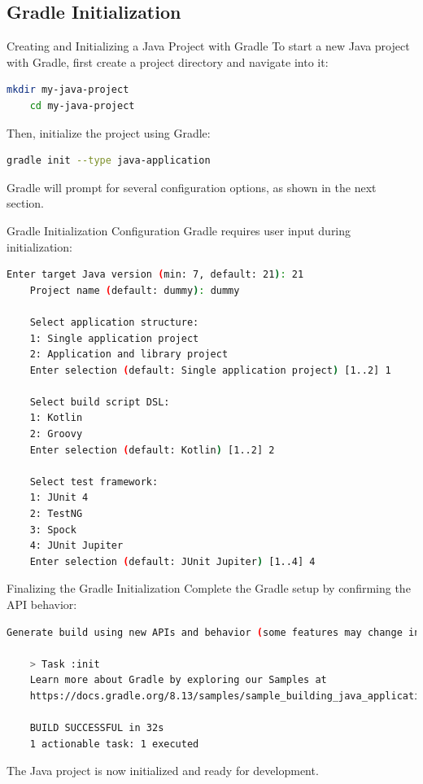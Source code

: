 \documentclass[aspectratio=169, table]{beamer}
\begin{document}
\subsection{Gradle Initialization}
\begin{frame}[fragile]{Creating and Initializing a Java Project with Gradle}
\vspace{20pt}
To start a new Java project with Gradle, first create a project directory and navigate into it:

\begin{lstlisting}[language=bash]
	mkdir my-java-project
	cd my-java-project
\end{lstlisting}

Then, initialize the project using Gradle:

\begin{lstlisting}[language=bash]
	gradle init --type java-application
\end{lstlisting}

Gradle will prompt for several configuration options, as shown in the next section.
\end{frame}

\begin{frame}[fragile]{Gradle Initialization Configuration}
\vspace{30pt}
Gradle requires user input during initialization:

\begin{lstlisting}[language=bash]
	Enter target Java version (min: 7, default: 21): 21
	Project name (default: dummy): dummy
	
	Select application structure:
	1: Single application project
	2: Application and library project
	Enter selection (default: Single application project) [1..2] 1
	
	Select build script DSL:
	1: Kotlin
	2: Groovy
	Enter selection (default: Kotlin) [1..2] 2
	
	Select test framework:
	1: JUnit 4
	2: TestNG
	3: Spock
	4: JUnit Jupiter
	Enter selection (default: JUnit Jupiter) [1..4] 4
\end{lstlisting}
\end{frame}

\begin{frame}[fragile]{Finalizing the Gradle Initialization}
\vspace{20pt}
Complete the Gradle setup by confirming the API behavior:

\begin{lstlisting}[language=bash]
	Generate build using new APIs and behavior (some features may change in the next minor release)? (default: no) [yes, no] no
	
	> Task :init
	Learn more about Gradle by exploring our Samples at 
	https://docs.gradle.org/8.13/samples/sample_building_java_applications.html
	
	BUILD SUCCESSFUL in 32s
	1 actionable task: 1 executed
\end{lstlisting}

The Java project is now initialized and ready for development.
\end{frame}
\end{document}
